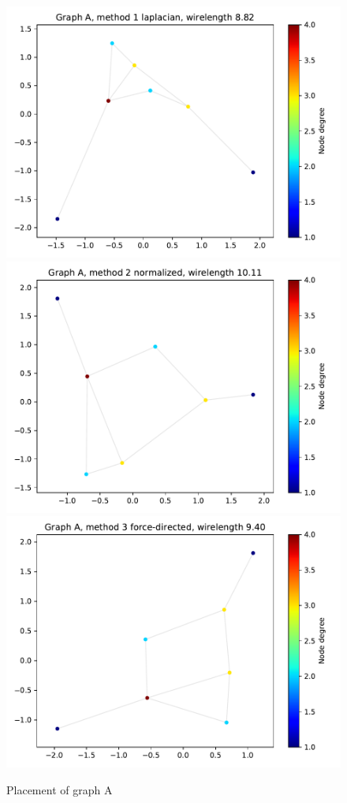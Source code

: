 \documentclass[a4paper,twocolumn]{article}
\begin{document}
\begin{figure}[h]
	\centering
	\includegraphics[width=\columnwidth]{fig/A/laplacian.pdf}
	\includegraphics[width=\columnwidth]{fig/A/norm.pdf}
	\includegraphics[width=\columnwidth]{fig/A/spring.pdf}
	\caption{Placement of graph A}
	\label{fig:graphA}
\end{figure}
\end{document}
